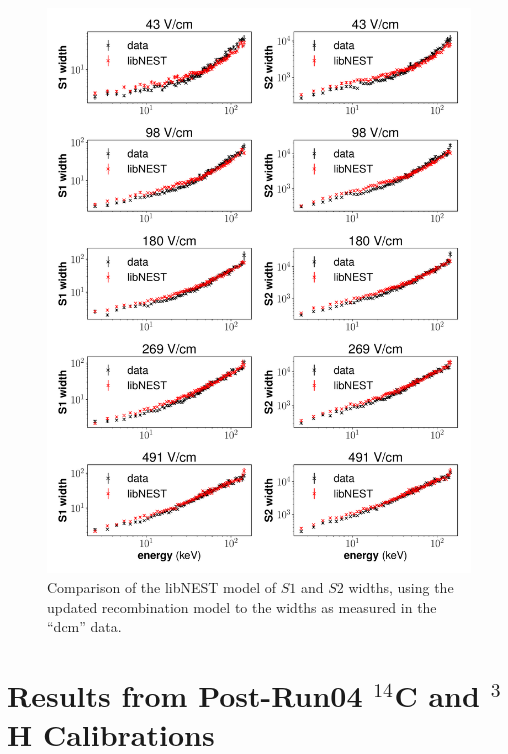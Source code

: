 \begin{figure}[h!]
\centering
  \includegraphics[width=\textwidth]{Figures/sigR_fieldvar_dcm.pdf}
\caption{Comparison of the libNEST model of $S1$ and $S2$ widths, using the updated recombination model to the widths as measured in the ``dcm'' data. }
\label{fig:sigR_fieldvar_dcm}
\end{figure}

\clearpage

\section{Results from Post-Run04 $^{14}$C and $^{3}$H Calibrations}\label{sec:finalresults}
